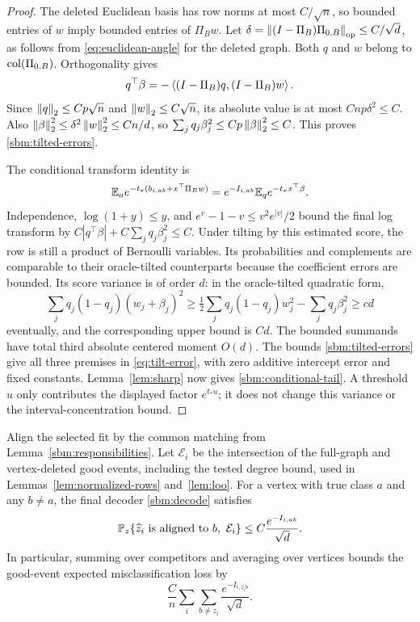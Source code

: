 \begin{proof}
The deleted Euclidean basis has row norms at most $C/\sqrt n$, so
bounded entries of $w$ imply bounded entries of $\Pi_Bw$.
Let $\delta=\left\lVert(I-\Pi_B)\Pi_{0,B}\right\rVert_{\mathrm{op}}\le C/\sqrt d$,
as follows from \eqref{eq:euclidean-angle} for the deleted graph.
Both $q$ and $w$ belong to $\operatorname{col}(\Pi_{0,B})$. Orthogonality gives
\[
 q^\top\beta
 =-\left\langle(I-\Pi_B)q,(I-\Pi_B)w\right\rangle.
\]
Since $\left\lVert q\right\rVert_2\le Cp\sqrt n$ and $\left\lVert w\right\rVert_2\le C\sqrt n$,
its absolute value is at most $Cnp\delta^2\le C$.
Also $\left\lVert\beta\right\rVert_2^2\le\delta^2\left\lVert w\right\rVert_2^2\le Cn/d$, so
$\sum_jq_j\beta_j^2\le Cp\left\lVert\beta\right\rVert_2^2\le C$.
This proves \eqref{sbm:tilted-errors}.

The conditional transform identity is
\[
 \mathbb E_a e^{-t_*(b_{i,ab}+x^\top\Pi_Bw)}
 =e^{-I_{i,ab}}\mathbb E_{q}e^{-t_*x^\top\beta}.
\]
Independence, $\log(1+y)\le y$, and
$e^v-1-v\le v^2e^{|v|}/2$ bound the final log transform by
$C|q^\top\beta|+C\sum_jq_j\beta_j^2\le C$.
Under tilting by this estimated score, the row is still a product of
Bernoulli variables. Its probabilities and complements are comparable
to their oracle-tilted counterparts because the coefficient errors
are bounded. Its score variance is of order $d$: in the oracle-tilted
quadratic form,
\[
 \sum_jq_j(1-q_j)(w_j+\beta_j)^2
 \ge\tfrac12\sum_jq_j(1-q_j)w_j^2
       -\sum_jq_j\beta_j^2\ge cd
\]
eventually, and the corresponding upper bound is $Cd$.
The bounded summands have total third absolute centered moment $O(d)$.
The bounds \eqref{sbm:tilted-errors} give all three premises in
\eqref{eq:tilt-error}, with zero additive intercept error and fixed
constants. Lemma~\ref{lem:sharp} now gives
\eqref{sbm:conditional-tail}.
A threshold $u$ only contributes the displayed factor $e^{t_*u}$;
it does not change this variance or the interval-concentration bound.
\end{proof}

\begin{proposition}
\label{sbm:good-event-risk}
Align the selected fit by the common matching from
Lemma~\ref{sbm:responsibilities}. Let $\mathcal E_i$ be the intersection
of the full-graph and vertex-deleted good events, including the tested
degree bound, used in Lemmas~\ref{lem:normalized-rows} and~\ref{lem:loo}.
For a vertex with true class $a$ and any $b\ne a$, the final decoder
\eqref{sbm:decode} satisfies
\begin{equation}
 \PP_z\{\widehat z_i\text{ is aligned to }b,\ \mathcal E_i\}
 \le C\frac{e^{-I_{i,ab}}}{\sqrt d}.
 \label{sbm:good-event-bound}
\end{equation}
In particular, summing over competitors and averaging over vertices
bounds the good-event expected misclassification loss by
\begin{equation}
 \frac Cn\sum_i\sum_{b\ne z_i}
              \frac{e^{-I_{i,z_i b}}}{\sqrt d}.
 \label{sbm:good-average}
\end{equation}
\end{proposition}

